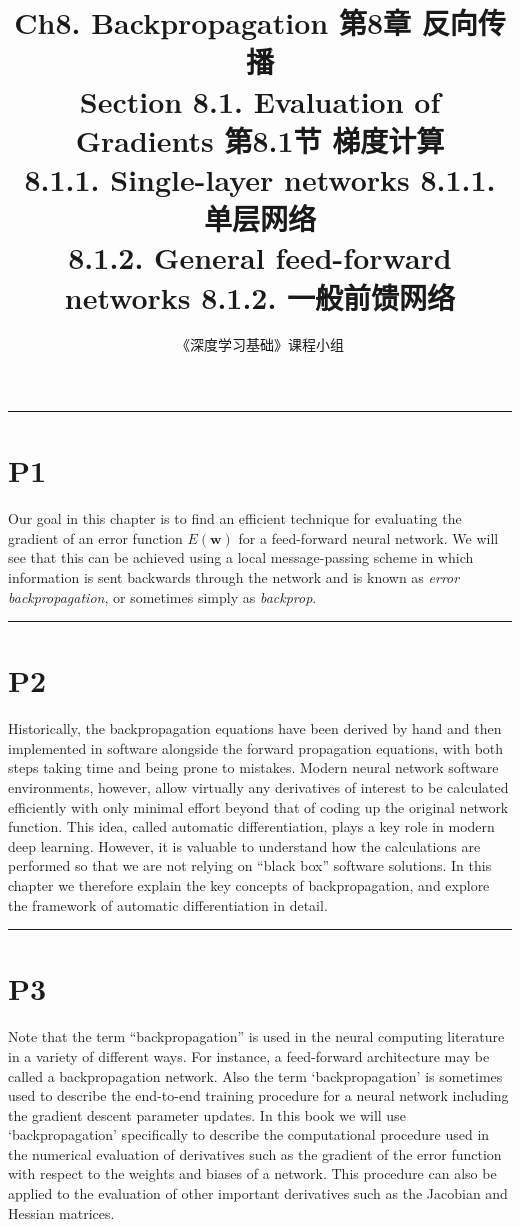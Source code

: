 \documentclass{article}
\title{Ch8. Backpropagation \hfill 第8章 反向传播 \\ 
Section 8.1. Evaluation of Gradients \hfill 第8.1节 梯度计算 \\ 
8.1.1. Single-layer networks \hfill 8.1.1. 单层网络 \\
8.1.2. General feed-forward networks \hfill 8.1.2. 一般前馈网络}
\author{《深度学习基础》课程小组}
\begin{document}
\maketitle

\setlength{\parindent}{0pt} %
\setlength{\parskip}{1.5em} %

\noindent\rule{\linewidth}{0.4pt}

\section{P1}

Our goal in this chapter is to find an efficient technique for evaluating the gradient of an error function $E(\mathbf{w})$ for a feed-forward neural network. We will see that this can be achieved using a local message-passing scheme in which information is sent backwards through the network and is known as \textit{error backpropagation}, or sometimes simply as \textit{backprop}.

\noindent\rule{\linewidth}{0.4pt}

\section{P2}

Historically, the backpropagation equations have been derived by hand and then implemented in software alongside the forward propagation equations, with both steps taking time and being prone to mistakes. Modern neural network software environments, however, allow virtually any derivatives of interest to be calculated efficiently with only minimal effort beyond that of coding up the original network function. This idea, called automatic differentiation, plays a key role in modern deep learning. However, it is valuable to understand how the calculations are performed so that we are not relying on ``black box'' software solutions. In this chapter we therefore explain the key concepts of backpropagation, and explore the framework of automatic differentiation in detail.

\noindent\rule{\linewidth}{0.4pt}

\section{P3}

Note that the term ``backpropagation'' is used in the neural computing literature in a variety of different ways. For instance, a feed-forward architecture may be called a backpropagation network. Also the term `backpropagation' is sometimes used to describe the end-to-end training procedure for a neural network including the gradient descent parameter updates. In this book we will use `backpropagation' specifically to describe the computational procedure used in the numerical evaluation of derivatives such as the gradient of the error function with respect to the weights and biases of a network. This procedure can also be applied to the evaluation of other important derivatives such as the Jacobian and Hessian matrices.
\end{document}
